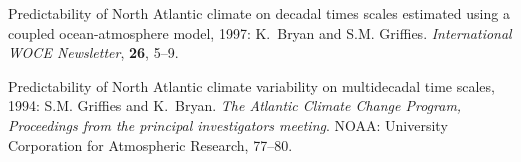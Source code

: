 \begin{etaremune}
\item Predictability of North Atlantic climate on decadal times scales estimated using a coupled ocean-atmosphere model, 1997: K.\ Bryan and S.M. Grif\/f\/ies.  {\em International WOCE Newsletter}, {\bf 26}, 5--9.

\item Predictability of North Atlantic climate variability on multidecadal time scales, 1994: S.M. Grif\/f\/ies and K.\ Bryan.  {\em The Atlantic Climate Change Program, Proceedings from the principal investigators meeting}.  NOAA: University Corporation for Atmospheric Research, 77--80.

\end{etaremune}

